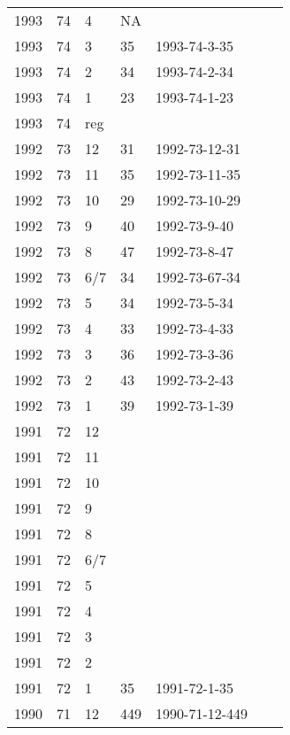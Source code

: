 \begin{longtable}{ |l|l|l|l|p{2.7cm}|l|p{2cm}| }
 1993 & 74 &     4 &  NA     &                &  & \\
 1993 & 74 &     3 &  35     & 1993-74-3-35   &  & \\
 1993 & 74 &     2 &     34  & 1993-74-2-34   &  & \\
 1993 & 74 &     1 &  23     & 1993-74-1-23   &  & \\
 1993 & 74 &   reg &         &                &  & \\
 1992 & 73 &    12 &     31  & 1992-73-12-31  &  & \\
 1992 & 73 &    11 &   35    & 1992-73-11-35  &  & \\
 1992 & 73 &    10 &   29    & 1992-73-10-29  &  & \\
 1992 & 73 &     9 &   40    & 1992-73-9-40   &  & \\
 1992 & 73 &     8 &    47   & 1992-73-8-47   &  & \\
 1992 & 73 &   6/7 &    34   &  1992-73-67-34 &  & \\
 1992 & 73 &     5 &      34 &  1992-73-5-34  &  & \\
 1992 & 73 &     4 &     33  &  1992-73-4-33  &  & \\
 1992 & 73 &     3 &    36   &  1992-73-3-36  &  & \\
 1992 & 73 &     2 &    43   & 1992-73-2-43   &  & \\
 1992 & 73 &     1 &     39  & 1992-73-1-39   &  & \\
 1991 & 72 &    12 &         &                &  & \\
 1991 & 72 &    11 &         &                &  & \\
 1991 & 72 &    10 &         &                &  & \\
 1991 & 72 &     9 &         &                &  & \\
 1991 & 72 &     8 &         &                &  & \\
 1991 & 72 &   6/7 &         &                &  & \\
 1991 & 72 &     5 &         &                &  & \\
 1991 & 72 &     4 &         &                &  & \\
 1991 & 72 &     3 &         &                &  & \\
 1991 & 72 &     2 &         &                &  & \\
 1991 & 72 &     1 &  35     & 1991-72-1-35   &  & \\
 1990 & 71 &    12 &   449   & 1990-71-12-449 &  & \\

\end{longtable}
